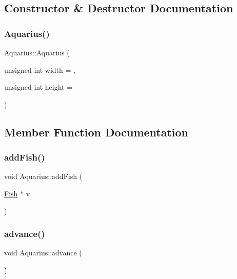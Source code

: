 \subsection{Constructor \& Destructor Documentation}
\mbox{\label{classAquarius_a7c8e40855d95468d8264ba0a1558d481_a7c8e40855d95468d8264ba0a1558d481}} 
\subsubsection{\texorpdfstring{Aquarius()}{Aquarius()}}
{\footnotesize\ttfamily Aquarius\+::\+Aquarius (\begin{DoxyParamCaption}\item[{unsigned int}]{width = {},  }\item[{unsigned int}]{height = {} }\end{DoxyParamCaption})}



\subsection{Member Function Documentation}
\mbox{\label{classAquarius_ab1d6d5d8f64be1cb8a0b9d0f0edea174_ab1d6d5d8f64be1cb8a0b9d0f0edea174}} 
\subsubsection{\texorpdfstring{add\+Fish()}{addFish()}}
{\footnotesize\ttfamily void Aquarius\+::add\+Fish (\begin{DoxyParamCaption}\item[{\hyperlink{classFish}{Fish} $\ast$}]{v }\end{DoxyParamCaption})}

\mbox{\label{classAquarius_a9fb56287ead8d2ac5b64098b95557bdd_a9fb56287ead8d2ac5b64098b95557bdd}} 
\subsubsection{\texorpdfstring{advance()}{advance()}}
{\footnotesize\ttfamily void Aquarius\+::advance (\begin{DoxyParamCaption}{ }\end{DoxyParamCaption})}

